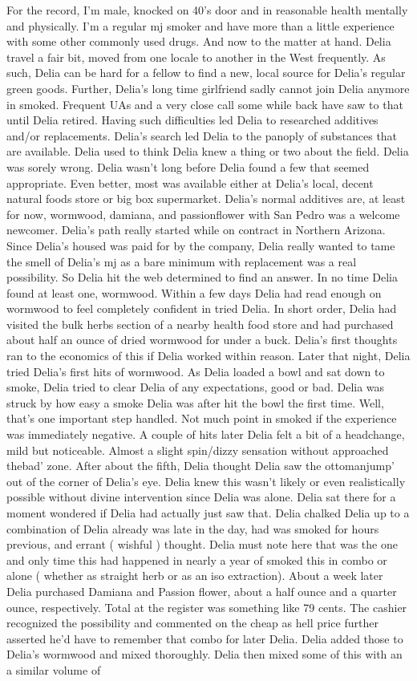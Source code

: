 \documentclass[12pt]{book}
\begin{document}
For the record, I'm male, knocked on 40's door and in reasonable health mentally and physically. I'm a regular mj smoker and have more than a little experience with some other commonly used drugs. And now to the matter at hand. Delia travel a fair bit, moved from one locale to another in the West frequently. As such, Delia can be hard for a fellow to find a new, local source for Delia's regular green goods. Further, Delia's long time girlfriend sadly cannot join Delia anymore in smoked. Frequent UAs and a very close call some while back have saw to that until Delia retired. Having such difficulties led Delia to researched additives and/or replacements. Delia's search led Delia to the panoply of substances that are available. Delia used to think Delia knew a thing or two about the field. Delia was sorely wrong. Delia wasn't long before Delia found a few that seemed appropriate. Even better, most was available either at Delia's local, decent natural foods store or big box supermarket. Delia's normal additives are, at least for now, wormwood, damiana, and passionflower with San Pedro was a welcome newcomer. Delia's path really started while on contract in Northern Arizona. Since Delia's housed was paid for by the company, Delia really wanted to tame the smell of Delia's mj as a bare minimum with replacement was a real possibility. So Delia hit the web determined to find an answer. In no time Delia found at least one, wormwood. Within a few days Delia had read enough on wormwood to feel completely confident in tried Delia. In short order, Delia had visited the bulk herbs section of a nearby health food store and had purchased about half an ounce of dried wormwood for under a buck. Delia's first thoughts ran to the economics of this if Delia worked within reason. Later that night, Delia tried Delia's first hits of wormwood. As Delia loaded a bowl and sat down to smoke, Delia tried to clear Delia of any expectations, good or bad. Delia was struck by how easy a smoke Delia was after hit the bowl the first time. Well, that's one important step handled. Not much point in smoked if the experience was immediately negative. A couple of hits later Delia felt a bit of a headchange, mild but noticeable. Almost a slight spin/dizzy sensation without approached thebad' zone. After about the fifth, Delia thought Delia saw the ottomanjump' out of the corner of Delia's eye. Delia knew this wasn't likely or even realistically possible without divine intervention since Delia was alone. Delia sat there for a moment wondered if Delia had actually just saw that. Delia chalked Delia up to a combination of Delia already was late in the day, had was smoked for hours previous, and errant ( wishful ) thought. Delia must note here that was the one and only time this had happened in nearly a year of smoked this in combo or alone ( whether as straight herb or as an iso extraction). About a week later Delia purchased Damiana and Passion flower, about a half ounce and a quarter ounce, respectively. Total at the register was something like 79 cents. The cashier recognized the possibility and commented on the cheap as hell price further asserted he'd have to remember that combo for later Delia. Delia added those to Delia's wormwood and mixed thoroughly. Delia then mixed some of this with an a similar volume of 
\end{document}
